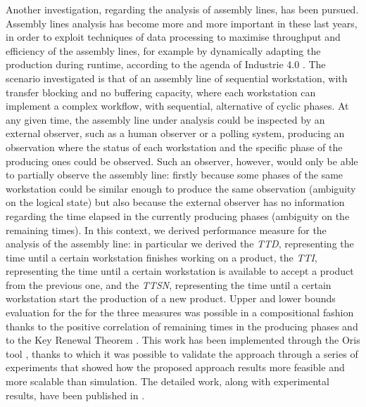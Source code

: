   Another investigation, regarding the analysis of assembly lines, has been pursued. Assembly lines analysis has become more and more important in these last years, in order to exploit techniques of data processing to maximise throughput and efficiency of the assembly lines, for example by dynamically adapting the production during runtime, according to the agenda of Industrie 4.0 \cite{hermann2016design}. The scenario investigated is that of an assembly line of sequential workstation, with transfer blocking and no buffering capacity, where each workstation can implement a complex workflow, with sequential, alternative of cyclic phases. At any given time, the assembly line under analysis could be inspected by an external observer, such as a human observer or a polling system, producing an observation where the status of each workstation and the specific phase of the producing ones could be observed. Such an observer, however, would only be able to partially observe the assembly line: firstly because some phases of the same workstation could be similar enough to produce the same observation (ambiguity on the logical state) but also because the external observer has no information regarding the time elapsed in the currently producing phases (ambiguity on the remaining times). In this context, we derived performance measure for the analysis of the assembly line: in particular we derived the \textit{\ac{TTD}}, representing the time until a certain workstation finishes working on a product, the \textit{\ac{TTI}}, representing the time until a certain workstation is available to accept a product from the previous one, and the \textit{\ac{TTSN}}, representing the time until a certain workstation start the production of a new product. Upper and lower bounds evaluation for the  for the three measures was possible in a compositional fashion thanks to the positive correlation of remaining times in the producing phases and to the Key Renewal Theorem \cite{serfozo2009basics}. This work has been implemented through the Oris tool , thanks to which it was possible to validate the approach through a series of experiments that showed how the proposed approach results more feasible and more scalable than simulation. The detailed work, along with experimental results, have been published in \cite{biagi2017inspection}.
  
  
  
\newpage
